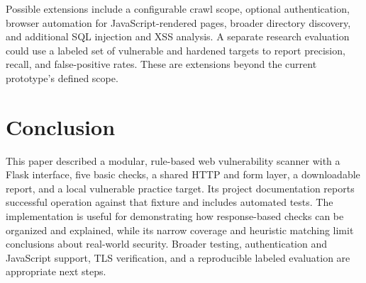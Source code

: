 \documentclass[conference]{IEEEtran}
\begin{document}
Possible extensions include a configurable crawl scope, optional
authentication, browser automation for JavaScript-rendered pages, broader
directory discovery, and additional SQL injection and XSS analysis. A separate
research evaluation could use a labeled set of vulnerable and hardened targets
to report precision, recall, and false-positive rates. These are extensions
beyond the current prototype's defined scope.

\section{Conclusion}
This paper described a modular, rule-based web vulnerability scanner with a
Flask interface, five basic checks, a shared HTTP and form layer, a downloadable
report, and a local vulnerable practice target. Its project documentation
reports successful operation against that fixture and includes automated
tests. The implementation is useful for demonstrating how response-based
checks can be organized and explained, while its narrow coverage and heuristic
matching limit conclusions about real-world security. Broader testing,
authentication and JavaScript support, TLS verification, and a reproducible
labeled evaluation are appropriate next steps.
\end{document}
